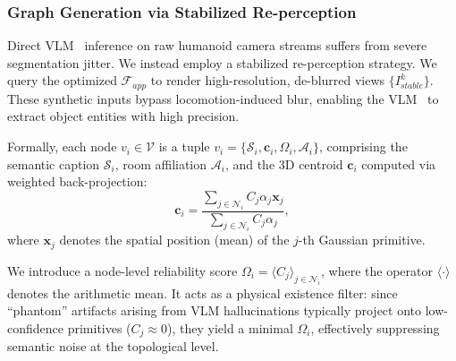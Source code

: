 \documentclass[conference]{IEEEtran}
\begin{document}

\subsubsection{Graph Generation via Stabilized Re-perception}
Direct VLM~\cite{chen2025sam, redmon2016you} inference on raw humanoid camera streams suffers from severe segmentation jitter. We instead employ a stabilized re-perception strategy. We query the optimized $\mathcal{F}_{app}$ to render high-resolution, de-blurred views $\{I_{stable}^k\}$. These synthetic inputs bypass locomotion-induced blur, enabling the VLM~\cite{chen2025sam, redmon2016you} to extract object entities with high precision.

Formally, each node $v_i \in \mathcal{V}$ is a tuple $v_i = \{ \mathcal{S}_i, \mathbf{c}_i, \Omega_i, \mathcal{A}_i \}$, comprising the semantic caption $\mathcal{S}_i$, room affiliation $\mathcal{A}_i$, and the 3D centroid $\mathbf{c}_i$ computed via weighted back-projection:
\begin{equation}
    \mathbf{c}_i = \frac{\sum_{j \in \mathcal{N}_i} C_j \alpha_j \mathbf{x}_j}{\sum_{j \in \mathcal{N}_i} C_j \alpha_j} \label{eq:grounding} ,
\end{equation}
where $\mathbf{x}_j$ denotes the spatial position (mean) of the $j$-th Gaussian primitive.

We introduce a node-level reliability score $\Omega_i = \langle C_j \rangle_{j \in \mathcal{N}_i}$, where the operator $\langle \cdot \rangle$ denotes the arithmetic mean. It acts as a physical existence filter: since ``phantom'' artifacts arising from VLM hallucinations typically project onto low-confidence primitives ($C_j \approx 0$), they yield a minimal $\Omega_i$, effectively suppressing semantic noise at the topological level.
\end{document}
